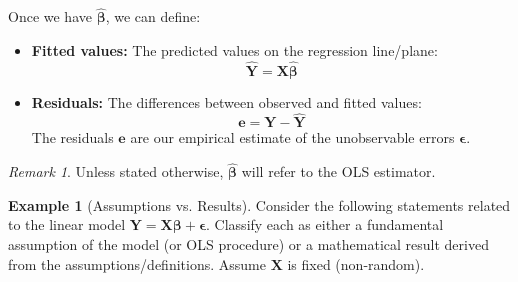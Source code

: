 \documentclass[11pt]{article}
\theoremstyle{definition}
\newtheorem{example}[theorem]{Example}
\theoremstyle{remark}
\newtheorem{remark}[theorem]{Remark}
\begin{document}
Once we have $\hat{\bm{\beta}}$, we can define:
\begin{itemize}
    \item \textbf{Fitted values:} The predicted values on the regression line/plane:
    \[ \hat{\bm{Y}} = \bm{X}\hat{\bm{\beta}} \]
    \item \textbf{Residuals:} The differences between observed and fitted values:
    \[ \bm{e} = \bm{Y} - \hat{\bm{Y}} \]
    The residuals $\bm{e}$ are our empirical estimate of the unobservable errors $\bm{\epsilon}$.
\end{itemize}
\begin{remark}
    Unless stated otherwise, $\hat{\bm{\beta}}$ will refer to the OLS estimator.
\end{remark}

\begin{example}[Assumptions vs. Results] \label{ex:assumptions_results}
    Consider the following statements related to the linear model $\bm{Y} = \bm{X}\bm{\beta} + \bm{\epsilon}$. Classify each as either a fundamental assumption of the model (or OLS procedure) or a mathematical result derived from the assumptions/definitions. Assume $\bm{X}$ is fixed (non-random).


\end{example}
\end{document}
